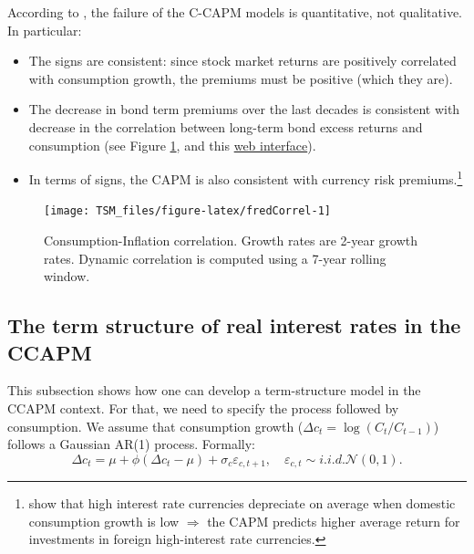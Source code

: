 \documentclass[
  12pt,
]{book}
\providecommand{\tightlist}{%
  \setlength{\itemsep}{0pt}\setlength{\parskip}{0pt}}
\theoremstyle{definition}
\theoremstyle{definition}
\theoremstyle{definition}
\theoremstyle{definition}
\theoremstyle{remark}
\begin{document}
According to \citet{Cochrane_2005}, the failure of the C-CAPM models is quantitative, not qualitative. In particular:

\begin{itemize}
\tightlist
\item
  The signs are consistent: since stock market returns are positively correlated with consumption growth, the premiums must be positive (which they are).
\item
  The decrease in bond term premiums over the last decades is consistent with decrease in the correlation between long-term bond excess returns and consumption (see Figure \ref{fig:fredCorrel}, and this \href{https://jrenne.shinyapps.io/APModels}{web interface}).
\item
  In terms of signs, the CAPM is also consistent with currency risk premiums.\footnote{\citet{Lustig_Verdelhan_2007} show that high interest rate currencies depreciate on average when domestic consumption growth is low \(\Rightarrow\) the CAPM predicts higher average return for investments in foreign high-interest rate currencies.}
\end{itemize}

\begin{figure}
\texttt{[image: TSM\_files/figure-latex/fredCorrel-1]} \caption{Consumption-Inflation correlation. Growth rates are 2-year growth rates. Dynamic correlation is computed using a 7-year rolling window.}\label{fig:fredCorrel}
\end{figure}

\hypertarget{the-term-structure-of-real-interest-rates-in-the-ccapm}{%
\subsection{The term structure of real interest rates in the CCAPM}\label{the-term-structure-of-real-interest-rates-in-the-ccapm}}

This subsection shows how one can develop a term-structure model in the CCAPM context. For that, we need to specify the process followed by consumption. We assume that consumption growth (\(\Delta c_{t}=\log (C_{t}/C_{t-1})\)) follows a Gaussian AR(1) process. Formally:
\[
\Delta c_{t} = \mu + \phi (\Delta c_t - \mu) + \sigma_c \varepsilon_{c,t+1},\quad \varepsilon_{c,t} \sim i.i.d.\mathcal{N}(0,1).
\]
\end{document}
